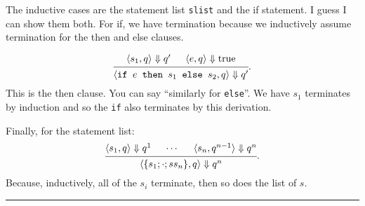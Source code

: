 \documentclass[11pt]{article}
\newcommand{\qedsymbol}{\rule{1ex}{1ex}}
\begin{document}
The inductive cases are the statement list \texttt{slist} and the if statement. I guess I can show them both.
For if, we have termination because we inductively assume termination for the then and else clauses.

\[
  \begin{prooftree}
    \hypo{\langle s_1, q \rangle \Downarrow q'}
    \hypo{\langle e, q \rangle \Downarrow \mbox{true}}
  \infer2{\langle \texttt{if $e$ then $s_1$ else $s_2$}, q \rangle \Downarrow q'}
  \end{prooftree}
  .
  \]
  This is the then clause. You can say ``similarly for \texttt{else}''. We have $s_1$ terminates by induction
  and so the \texttt{if} also terminates by this derivation.

Finally, for the statement list:  
\[
  \begin{prooftree}
    \hypo{\langle s_1, q \rangle \Downarrow q^1}
    \hypo{\cdots}
    \hypo{\langle s_n, q^{n-1} \rangle \Downarrow q^n}
  \infer3{\langle \{ s_1 ; \cdot ;s s_n \}, q \rangle \Downarrow q^n}
  \end{prooftree}
  .
  \]
Because, inductively, all of the $s_i$ terminate, then so does the list of $s$. ~~\qedsymbol
\end{document}
